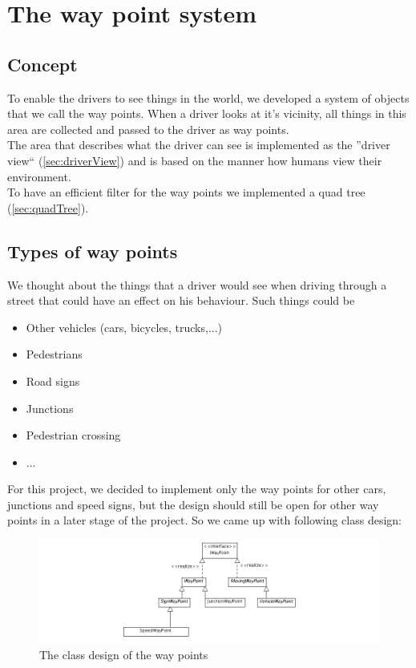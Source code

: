 \section{The way point system}

\subsection{Concept}

To enable the drivers to see things in the world, we developed a system of 
objects that we call the way points. When a driver looks at it's vicinity, all
things in this area are collected and passed to the driver as way points.\\

\noindent The area that describes what the driver can see is implemented as the 
''driver view`` (\ref{sec:driverView}) and is based on the manner 
how humans view their environment. \\

\noindent To have an efficient filter for the way points we implemented a quad tree 
(\ref{sec:quadTree}).

\subsection{Types of way points}

We thought about the things that a driver would see when driving through a 
street that could have an effect on his behaviour. Such things could be

\begin{itemize}
\item Other vehicles (cars, bicycles, trucks,...)
\item Pedestrians
\item Road signs
\item Junctions
\item Pedestrian crossing
\item ...
\end{itemize}

For this project, we decided to implement only the way points for other
cars, junctions and speed signs, but the design should still be open for 
other way points in a later stage of the project. So we came up with following
class design:

\begin{figure}[htb]
\includegraphics[width=\textwidth]{images/waypoints.png}
\caption{The class design of the way points}
\label{fig:waypoints}
\end{figure}

